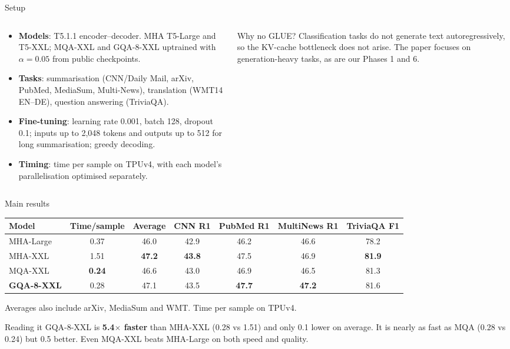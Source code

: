 \documentclass[aspectratio=169,11pt]{beamer}
\begin{document}
\begin{frame}{Setup}
  \begin{columns}[T]
    \begin{column}{0.52\textwidth}
      \small
      \begin{itemize}
        \item \textbf{Models}: T5.1.1 encoder--decoder. MHA T5-Large and T5-XXL; MQA-XXL and GQA-8-XXL uptrained with $\alpha=0.05$ from public checkpoints.
        \item \textbf{Tasks}: summarisation (CNN/Daily Mail, arXiv, PubMed, MediaSum, Multi-News), translation (WMT14 EN--DE), question answering (TriviaQA).
        \item \textbf{Fine-tuning}: learning rate 0.001, batch 128, dropout 0.1; inputs up to 2,048 tokens and outputs up to 512 for long summarisation; greedy decoding.
        \item \textbf{Timing}: time per sample on TPUv4, with each model's parallelisation optimised separately.
      \end{itemize}
    \end{column}
    \begin{column}{0.44\textwidth}
      \begin{alertblock}{Why no GLUE?}
        \small
        Classification tasks do not generate text autoregressively, so the KV-cache bottleneck does not arise.
        The paper focuses on generation-heavy tasks, as are our Phases 1 and 6.
      \end{alertblock}
    \end{column}
  \end{columns}
\end{frame}

\begin{frame}{Main results}
  \centering
  \footnotesize
  \begin{tabular}{@{}lcccccc@{}}
    \toprule
    Model & Time/sample & Average & CNN R1 & PubMed R1 & MultiNews R1 & TriviaQA F1\\
    \midrule
    MHA-Large & 0.37 & 46.0 & 42.9 & 46.2 & 46.6 & 78.2\\
    MHA-XXL & 1.51 & \textbf{47.2} & \textbf{43.8} & 47.5 & 46.9 & \textbf{81.9}\\
    MQA-XXL & \textbf{0.24} & 46.6 & 43.0 & 46.9 & 46.5 & 81.3\\
    \textbf{GQA-8-XXL} & 0.28 & 47.1 & 43.5 & \textbf{47.7} & \textbf{47.2} & 81.6\\
    \bottomrule
  \end{tabular}
  \vspace{1mm}

  {\scriptsize Averages also include arXiv, MediaSum and WMT. Time per sample on TPUv4.}
  \vspace{2mm}
  \raggedright
  \begin{exampleblock}{Reading it}
    \small
    GQA-8-XXL is \textbf{5.4$\times$ faster} than MHA-XXL (0.28 vs 1.51) and only 0.1 lower on average.
    It is nearly as fast as MQA (0.28 vs 0.24) but 0.5 better. Even MQA-XXL beats MHA-Large on both speed and quality.
  \end{exampleblock}
\end{frame}
\end{document}
